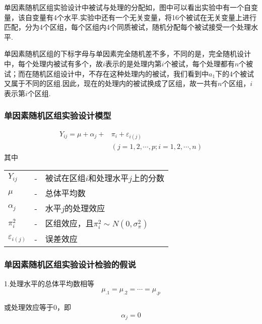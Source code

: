 单因素随机区组实验设计中被试与处理的分配如，图中可以看出实验中有一个自变量，该自变量有4个水平.实验中还有一个无关变量，将16个被试在无关变量上进行匹配，分为4个区组，每个区组内4个同质被试，随机分配每个被试接受一个处理水平.

单因素随机区组的下标字母与单因素完全随机差不多，不同的是，完全随机设计中，每个处理内被试有多个，故$i$表示的是处理内第$i$个被试，每个处理都有$n$个被试；而在随机区组设计中，不存在这种处理内的被试，我们看到中$a_1$下的4个被试又属于不同的区组.因此，现在的处理内的被试换成了区组，故一共有$n$个区组，$i$表示第$i$个区组.

\subsubsection{单因素随机区组实验设计模型}

\begin{definition}[单因素随机区组设计模型]
\begin{align*}
    Y_{ij} = \mu + \alpha _j +  & \pi _i + \varepsilon _{i\left(j\right)}\\
                                & \left( j=1,2,\cdots , p;i = 1,2,\cdots,n \right)
\end{align*}
其中

{
    \renewcommand\arraystretch{1.25}
    \begin{tabular}{lcl}
        $Y_{ij}$ & - & 被试在区组$i$和处理水平$j$上的分数 \\
        $\mu$ & - & 总体平均数 \\
        $\alpha _j$ & - & 水平$j$的处理效应 \\
        $\pi _i ^2$ & - & 区组效应，且$\pi _i ^2\sim N\left(0,\sigma _\pi ^2\right)$\\
        $\varepsilon_{i \left( j \right)}$ & - & 误差效应 \\
    \end{tabular}
}
\end{definition}


%
%
%
%
\subsubsection{单因素随机区组实验设计检验的假说}



1.处理水平的总体平均数相等
\[ \mu _{.1} = \mu _{.2} = \cdots = \mu _{.p} \]

或处理效应等于0，即
\[ \alpha _j = 0 \]

